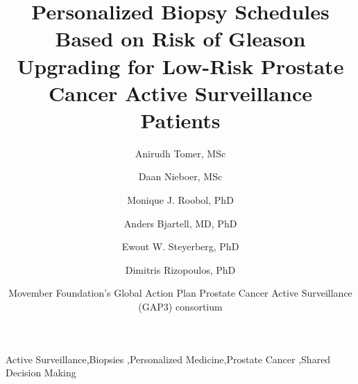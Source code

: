 \documentclass[review, 12pt]{elsarticle}
\begin{document}
\begin{frontmatter}

\title{Personalized Biopsy Schedules Based on Risk of Gleason Upgrading for Low-Risk Prostate Cancer Active Surveillance Patients}

\author[1]{Anirudh Tomer, MSc} 

\author[2,3]{Daan Nieboer, MSc}

\author[3]{Monique J. Roobol, PhD}

\author[4]{Anders Bjartell, MD, PhD}

\author[2,5]{Ewout W. Steyerberg, PhD}

\author[1]{Dimitris Rizopoulos, PhD}

\author[6]{Movember Foundation's Global Action Plan Prostate Cancer Active Surveillance (GAP3) consortium}

\address[1]{Department of Biostatistics, Erasmus University Medical Center, Rotterdam, the Netherlands}
\address[2]{Department of Public Health, Erasmus University Medical Center, Rotterdam, the Netherlands}
\address[3]{Department of Urology, Erasmus University Medical Center, Rotterdam, the Netherlands}
\address[4]{Department of Urology, Sk\r{a}ne University Hospital, Malm\"{o}, Sweden}
\address[5]{Department of Biomedical Data Sciences, Leiden University Medical Center, Leiden, the Netherlands}
\address[6]{The Movember Foundation's Global Action Plan Prostate Cancer Active Surveillance (GAP3) consortium members presented in Appendix A}




\begin{keyword}
Active Surveillance\sep Biopsies \sep Personalized Medicine\sep Prostate Cancer \sep Shared Decision Making
\end{keyword}

\end{frontmatter}

\linenumbers
\end{document}
